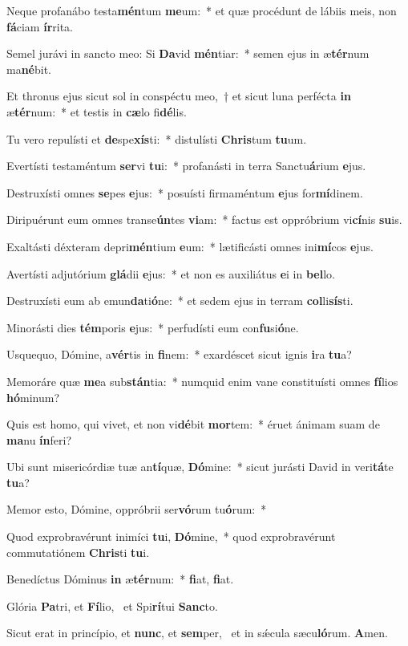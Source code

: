 \item Neque profanábo testa\textbf{mén}tum \textbf{me}um:~* et quæ procédunt de lábiis meis, non \textbf{fá}ciam \textbf{ír}rita.
\item Semel jurávi in sancto meo: Si \textbf{Da}vid \textbf{mén}tiar:~* semen ejus in æ\textbf{tér}num ma\textbf{né}bit.
\item Et thronus ejus sicut sol in conspéctu meo,~† et sicut luna perfécta \textbf{in} æ\textbf{tér}num:~* et testis in \textbf{cæ}lo fi\textbf{dé}lis.
\item Tu vero repulísti et \textbf{de}spe\textbf{xís}ti:~* distulísti \textbf{Chris}tum \textbf{tu}um.
\item Evertísti testaméntum \textbf{ser}vi \textbf{tu}i:~* profanásti in terra Sanctu\textbf{á}rium \textbf{e}jus.
\item Destruxísti omnes \textbf{se}pes \textbf{e}jus:~* posuísti firmaméntum \textbf{e}jus for\textbf{mí}dinem.
\item Diripuérunt eum omnes transe\textbf{ún}tes \textbf{vi}am:~* factus est oppróbrium vi\textbf{cí}nis \textbf{su}is.
\item Exaltásti déxteram depri\textbf{mén}tium \textbf{e}um:~* lætificásti omnes ini\textbf{mí}cos \textbf{e}jus.
\item Avertísti adjutórium \textbf{glá}dii \textbf{e}jus:~* et non es auxiliátus \textbf{e}i in \textbf{bel}lo.
\item Destruxísti eum ab emun\textbf{da}ti\-\textbf{ó}ne:~* et sedem ejus in terram \textbf{col}li\textbf{sís}ti.
\item Minorásti dies \textbf{tém}poris \textbf{e}jus:~* perfudísti eum con\textbf{fu}si\textbf{ó}ne.
\item Usquequo, Dómine, a\textbf{vér}tis in \textbf{fi}nem:~* exardéscet sicut ignis \textbf{i}ra \textbf{tu}a?
\item Memoráre quæ \textbf{me}a sub\textbf{stán}\-tia:~* numquid enim vane constituísti omnes \textbf{fí}lios \textbf{hó}minum?
\item Quis est homo, qui vivet, et non vi\textbf{dé}bit \textbf{mor}tem:~* éruet ánimam suam de \textbf{ma}nu \textbf{ín}feri?
\item Ubi sunt misericórdiæ tuæ an\textbf{tí}quæ, \textbf{Dó}mine:~* sicut jurásti David in veri\textbf{tá}te \textbf{tu}a?
\item Memor esto, Dómine, oppróbrii ser\textbf{vó}rum tu\textbf{ó}rum:~* 
\item Quod exprobravérunt inimíci \textbf{tu}i, \textbf{Dó}mine,~* quod exprobravérunt commutatiónem \textbf{Chris}ti \textbf{tu}i.
\item Benedíctus Dóminus \textbf{in} æ\textbf{tér}num:~* \textbf{fi}at, \textbf{fi}at.
\item Glória \textbf{Pa}tri, et \textbf{Fí}lio,~\psstar{} et Spi\textbf{rí}tui \textbf{Sanc}to.
\item Sicut erat in princípio, et \textbf{nunc}, et \textbf{sem}per,~\psstar{} et in sǽcula sæcu\textbf{ló}rum. \textbf{A}men.
